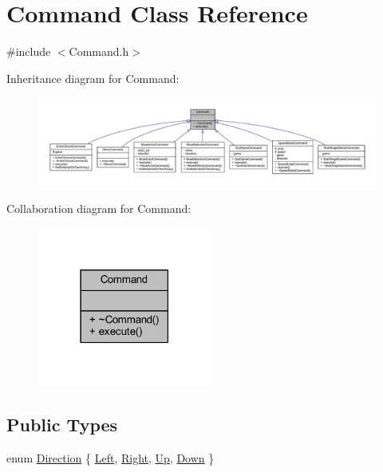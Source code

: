 \hypertarget{class_command}{}\section{Command Class Reference}
\label{class_command}


{\ttfamily \#include $<$Command.\+h$>$}



Inheritance diagram for Command\+:
\nopagebreak
\begin{figure}[H]
\begin{center}
\leavevmode
\includegraphics[width=350pt]{class_command__inherit__graph}
\end{center}
\end{figure}


Collaboration diagram for Command\+:
\nopagebreak
\begin{figure}[H]
\begin{center}
\leavevmode
\includegraphics[width=162pt]{class_command__coll__graph}
\end{center}
\end{figure}
\subsection*{Public Types}
\begin{DoxyCompactItemize}
\item 
enum \hyperlink{class_command_a53ddb82f75ac3516b27d8f92f93c5e09}{Direction} \{ \hyperlink{class_command_a53ddb82f75ac3516b27d8f92f93c5e09a0f13498a12abf82d3b7324eacb93405a}{Left}, 
\hyperlink{class_command_a53ddb82f75ac3516b27d8f92f93c5e09ac22330c293a1fbc82603aa19d27ce109}{Right}, 
\hyperlink{class_command_a53ddb82f75ac3516b27d8f92f93c5e09a4101280bbe84fa51f2393dac71f830cf}{Up}, 
\hyperlink{class_command_a53ddb82f75ac3516b27d8f92f93c5e09a7d1a60c1738de3a81c3118facd710d42}{Down}
 \}
\end{DoxyCompactItemize}

